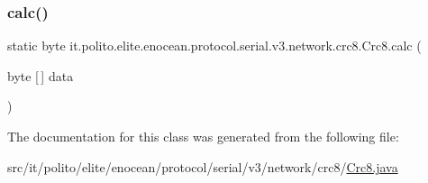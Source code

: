 \subsubsection{\texorpdfstring{calc()}{calc()}}
{\footnotesize\ttfamily static byte it.\+polito.\+elite.\+enocean.\+protocol.\+serial.\+v3.\+network.\+crc8.\+Crc8.\+calc (\begin{DoxyParamCaption}\item[{byte \mbox{[}$\,$\mbox{]}}]{data }\end{DoxyParamCaption})\hspace{0.3cm}{\ttfamily [static]}}



The documentation for this class was generated from the following file\+:\begin{DoxyCompactItemize}
\item 
src/it/polito/elite/enocean/protocol/serial/v3/network/crc8/\hyperlink{_crc8_8java}{Crc8.\+java}\end{DoxyCompactItemize}
